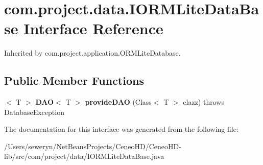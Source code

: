 \section{com.\+project.\+data.\+I\+O\+R\+M\+Lite\+Data\+Base Interface Reference}
\label{interfacecom_1_1project_1_1data_1_1_i_o_r_m_lite_data_base}


Inherited by com.\+project.\+application.\+O\+R\+M\+Lite\+Database.

\subsection*{Public Member Functions}
\begin{DoxyCompactItemize}
\item 
\mbox{\label{interfacecom_1_1project_1_1data_1_1_i_o_r_m_lite_data_base_a7e7acafade4fb8d12c5a535b89fdcab1}} 
$<$ T $>$ \textbf{ D\+AO}$<$ T $>$ {\bfseries provide\+D\+AO} (Class$<$ T $>$ clazz)  throws Database\+Exception
\end{DoxyCompactItemize}


The documentation for this interface was generated from the following file\+:\begin{DoxyCompactItemize}
\item 
/\+Users/seweryn/\+Net\+Beans\+Projects/\+Ceneo\+H\+D/\+Ceneo\+H\+D-\/lib/src/com/project/data/I\+O\+R\+M\+Lite\+Data\+Base.\+java\end{DoxyCompactItemize}
